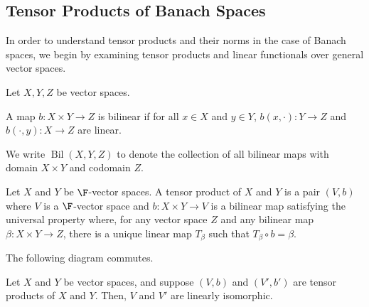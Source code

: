 \documentclass[10pt]{mypackage}
\DeclareMathOperator{\Bil}{Bil}
\begin{document}
\subsection{Tensor Products of Banach Spaces}%
In order to understand tensor products and their norms in the case of Banach spaces, we begin by examining tensor products and linear functionals over general vector spaces.
\begin{definition}
  Let $X,Y,Z$ be vector spaces.\newline

A map $b: X\times Y \rightarrow Z$ is bilinear if for all $x\in X$ and $y\in Y$, $b\left(x,\cdot\right): Y\rightarrow Z$ and $b\left(\cdot,y\right):X\rightarrow Z$ are linear.\newline

We write $\Bil(X,Y,Z)$ to denote the collection of all bilinear maps with domain $X\times Y$ and codomain $Z$.
\end{definition}
\begin{definition}
  Let $X$ and $Y$ be $\F$-vector spaces. A tensor product of $X$ and $Y$ is a pair $\left(V,b\right)$ where $V$ is a $\F$-vector space and $b: X\times Y\rightarrow V$ is a bilinear map satisfying the universal property where, for any vector space $Z$ and any bilinear map $\beta: X\times Y\rightarrow Z$, there is a unique linear map $T_{\beta}$ such that $T_{\beta}\circ b = \beta$.\newline

  The following diagram commutes.
  \begin{center}
  \end{center}
\end{definition}
\begin{fact}[]
  Let $X$ and $Y$ be vector spaces, and suppose $\left(V,b\right)$  and $\left(V',b'\right)$ are tensor products of $X$ and $Y$. Then, $V$ and $V'$ are linearly isomorphic.
\end{fact}
\end{document}
